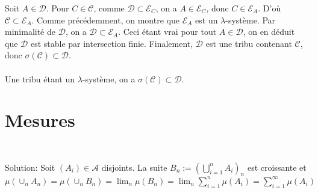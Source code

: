 \documentclass{report}
\begin{document}
Soit $A\in \mathcal D$. Pour $C\in \mathcal C$, comme $\mathcal D\subset \mathcal E_C$, on a $A\in \mathcal E_C$, donc $C\in \mathcal E_A$. D'où $\mathcal C \subset \mathcal E_A$. Comme précédemment, on montre que $\mathcal E_A$ est un $\lambda$-système. Par minimalité de $\mathcal D$, on a $\mathcal D \subset \mathcal E_A$.\newline
Ceci étant vrai pour tout $A\in \mathcal D$, on en déduit que $\mathcal D$ est stable par intersection finie.\newline
Finalement, $\mathcal D$ est une tribu contenant $\mathcal C$, donc $\sigma(\mathcal C)\subset \mathcal D$. \\\\
\fbox{$\supset$} Une tribu étant un $\lambda$-système, on a $\sigma(\mathcal C) \subset \mathcal D$.

\newpage
\section{Mesures}

\subsection{}  \\

Solution: Soit $(A_i)\in \mathcal A$ disjoints. La suite $\displaystyle B_n:=\left( \bigcup_{i=1}^n A_i\right)_n$ est croissante et \newline$\mu(\cup_n A_n) = \mu(\cup_n B_n)=\lim_n \mu(B_n)=\lim_n \sum_{i=1}^n \mu(A_i) = \sum_{i=1}^{\infty} \mu(A_i)$

\subsection{}  \\
\end{document}
